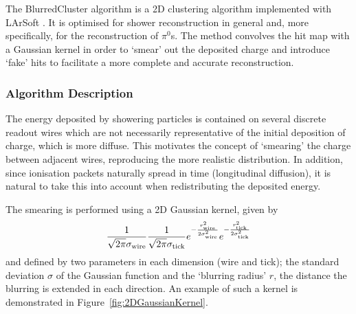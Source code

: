 The BlurredCluster algorithm is a 2D clustering algorithm \cite{KabothThesis} implemented with LArSoft \cite{BlurredCluster,BlurredClusterLArSoft}.  It is optimised for shower reconstruction in general and, more specifically, for the reconstruction of $\pi^0$s.  The method convolves the hit map with a Gaussian kernel in order to `smear' out the deposited charge and introduce `fake' hits to facilitate a more complete and accurate reconstruction.

\subsubsection{Algorithm Description}\label{sec:BlurredClusterDescription}

The energy deposited by showering particles is contained on several discrete readout wires which are not necessarily representative of the initial deposition of charge, which is more diffuse.  This motivates the concept of `smearing' the charge between adjacent wires, reproducing the more realistic distribution.  In addition, since ionisation packets naturally spread in time (longitudinal diffusion), it is natural to take this into account when redistributing the deposited energy.

The smearing is performed using a 2D Gaussian kernel, given by
\begin{equation}\label{eq:2DGaussianKernel}
  \frac{1}{\sqrt{2\pi}\sigma_{\textnormal{wire}}} \frac{1}{\sqrt{2\pi}\sigma_{\textnormal{tick}}} e^{-\frac{r_{\textnormal{wire}}^2}{2\sigma_{\textnormal{wire}}^2}} e^{-\frac{r_{\textnormal{tick}}^2}{2\sigma_{\textnormal{tick}}^2}}
\end{equation}
and defined by two parameters in each dimension (wire and tick); the standard deviation $\sigma$ of the Gaussian function and the `blurring radius' $r$, the distance the blurring is extended in each direction.  An example of such a kernel is demonstrated in Figure~\ref{fig:2DGaussianKernel}.

